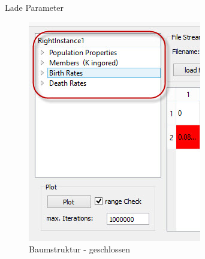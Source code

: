 \documentclass{beamer}
\begin{document}
\begin{frame}{Lade Parameter}
	\begin{minipage}{0.45\textwidth}
		\begin{figure}[H]
			\centering
			\includegraphics[width=1\linewidth]{./Pictures/MainWindow_ParameterBaum_zu}
			\caption[MainWindow_Parameter]{Baumstruktur - geschlossen}
			\label{Baumstruktur_geschlossen}
		\end{figure}
	\end{minipage} $ \quad $
	\begin{minipage}{0.45\textwidth}
		\begin{figure}[H]
			\centering

\end{figure}
\end{minipage}
\end{frame}
\end{document}
